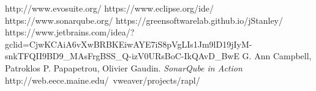 \documentclass[runningheads]{llncs}
\begin{document}
 

\newpage







\newpage

\begin{thebibliography}{8}

 {http://www.evosuite.org/}
 {https://www.eclipse.org/ide/}
 {https://www.sonarqube.org/}
 {https://greensoftwarelab.github.io/jStanley/}
 {https://www.jetbrains.com/idea/?gclid=CjwKCAiA6vXwBRBKEiwAYE7iS8pVgLIs1Jm9lD19jIyM-snkTFQII9BD9\_MAsFrgBSS\_Q-izV0URsBoC-IkQAvD\_BwE}
G. Ann Campbell, Patroklos P. Papapetrou, Olivier Gaudin.\textit{  SonarQube in Action}
 {http://web.eece.maine.edu/~vweaver/projects/rapl/}

\end{thebibliography}
\end{document}
